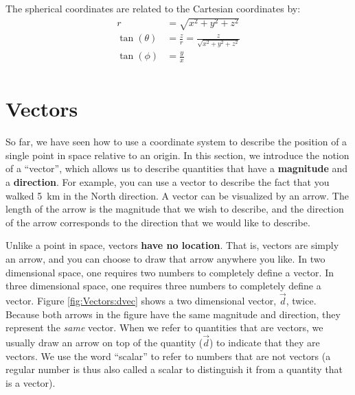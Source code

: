 
 The spherical coordinates are related to the Cartesian coordinates by:
\begin{align*}
r &= \sqrt{x^2+y^2+z^2}\\
\tan(\theta) &= \frac{z}{r}=\frac{z}{\sqrt{x^2+y^2+z^2}}\\
\tan(\phi) &= \frac{y}{x}\\
\end{align*}

\section{Vectors}
So far, we have seen how to use a coordinate system to describe the position of a single point in space relative to an origin. In this section, we introduce the notion of a ``vector'', which allows us to describe quantities that have a \textbf{magnitude} and a \textbf{direction}. For example, you can use a vector to describe the fact that you walked \SI{5}{km} in the North direction. A vector can be visualized by an arrow. The length of the arrow is the magnitude that we wish to describe, and the direction of the arrow corresponds to the direction that we would like to describe. 

Unlike a point in space, vectors \textbf{have no location}. That is, vectors are simply an arrow, and you can choose to draw that arrow anywhere you like. In two dimensional space, one requires two numbers to completely define a vector. In three dimensional space, one requires three numbers to completely define a vector. Figure \ref{fig:Vectors:dvec} shows a two dimensional vector, $\vec d$, twice. Because both arrows in the figure have the same magnitude and direction, they represent the \textit{same} vector. When we refer to quantities that are vectors, we usually draw an arrow on top of the quantity ($\vec d$) to indicate that they are vectors. We use the word ``scalar'' to refer to numbers that are not vectors (a regular number is thus also called a scalar to distinguish it from a quantity that is a vector).


